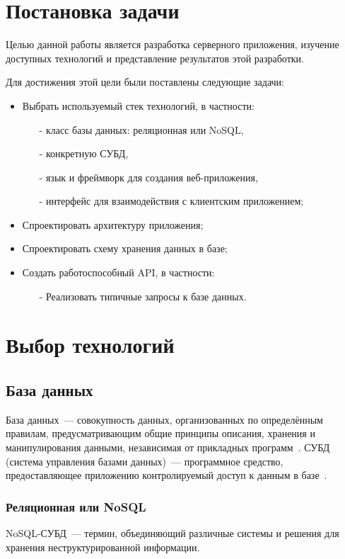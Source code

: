 \documentclass[14pt]{matmex-diploma-custom}
\begin{document}
\section{Постановка задачи}
Целью данной работы является разработка серверного приложения, изучение доступных технологий и представление результатов этой разработки.

Для достижения этой цели были поставлены следующие задачи:
\begin{itemize}
    \item Выбрать используемый стек технологий, в частности:
    \begin{itemize}
        \item[-] класс базы данных: реляционная или NoSQL,
        \item[-] конкретную СУБД,
        \item[-] язык и фреймворк для создания веб-приложения,
        \item[-] интерфейс для взаимодействия с клиентским приложением;
    \end{itemize}
    \item Спроектировать архитектуру приложения;
    \item Спроектировать схему хранения данных в базе;
    \item Создать работоспособный API, в частности:
    \begin{itemize}
        \item[-] Реализовать типичные запросы к базе данных.
    \end{itemize}
\end{itemize}

\section{Выбор технологий}

\subsection{База данных}
База данных~--- совокупность данных, организованных по определённым правилам,  предусматривающим  общие принципы  описания,  хранения  и манипулирования  данными,  независимая  от  прикладных  программ~\cite{gost}. СУБД (система управления базами данных)~--- программное средство, предоставляющее приложению контролируемый доступ к данным в базе~\cite{book:ency}.

\subsubsection{Реляционная или NoSQL}
NoSQL-СУБД~--- термин, объединяющий различные системы и решения для хранения неструктурированной информации.
\end{document}
